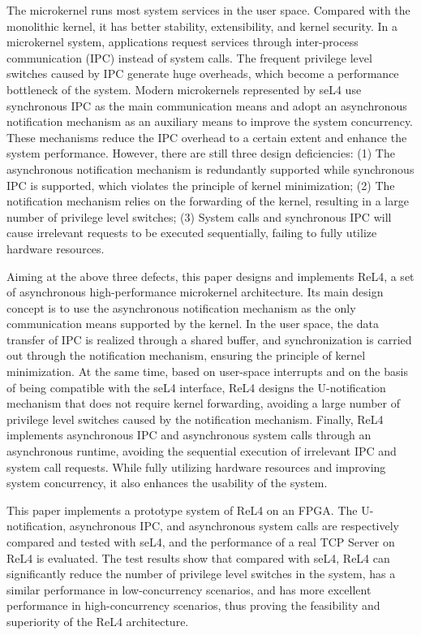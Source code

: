 \begin{englishabstract}
The microkernel runs most system services in the user space. Compared with the monolithic kernel, it has better stability, extensibility, and kernel security. In a microkernel system, applications request services through inter-process communication (IPC) instead of system calls. The frequent privilege level switches caused by IPC generate huge overheads, which become a performance bottleneck of the system. Modern microkernels represented by seL4 use synchronous IPC as the main communication means and adopt an asynchronous notification mechanism as an auxiliary means to improve the system concurrency. These mechanisms reduce the IPC overhead to a certain extent and enhance the system performance. However, there are still three design deficiencies: (1) The asynchronous notification mechanism is redundantly supported while synchronous IPC is supported, which violates the principle of kernel minimization; (2) The notification mechanism relies on the forwarding of the kernel, resulting in a large number of privilege level switches; (3) System calls and synchronous IPC will cause irrelevant requests to be executed sequentially, failing to fully utilize hardware resources.

Aiming at the above three defects, this paper designs and implements ReL4, a set of asynchronous high-performance microkernel architecture. Its main design concept is to use the asynchronous notification mechanism as the only communication means supported by the kernel. In the user space, the data transfer of IPC is realized through a shared buffer, and synchronization is carried out through the notification mechanism, ensuring the principle of kernel minimization. At the same time, based on user-space interrupts and on the basis of being compatible with the seL4 interface, ReL4 designs the U-notification mechanism that does not require kernel forwarding, avoiding a large number of privilege level switches caused by the notification mechanism. Finally, ReL4 implements asynchronous IPC and asynchronous system calls through an asynchronous runtime, avoiding the sequential execution of irrelevant IPC and system call requests. While fully utilizing hardware resources and improving system concurrency, it also enhances the usability of the system.

This paper implements a prototype system of ReL4 on an FPGA. The U-notification, asynchronous IPC, and asynchronous system calls are respectively compared and tested with seL4, and the performance of a real TCP Server on ReL4 is evaluated. The test results show that compared with seL4, ReL4 can significantly reduce the number of privilege level switches in the system, has a similar performance in low-concurrency scenarios, and has more excellent performance in high-concurrency scenarios, thus proving the feasibility and superiority of the ReL4 architecture.


\end{englishabstract}
